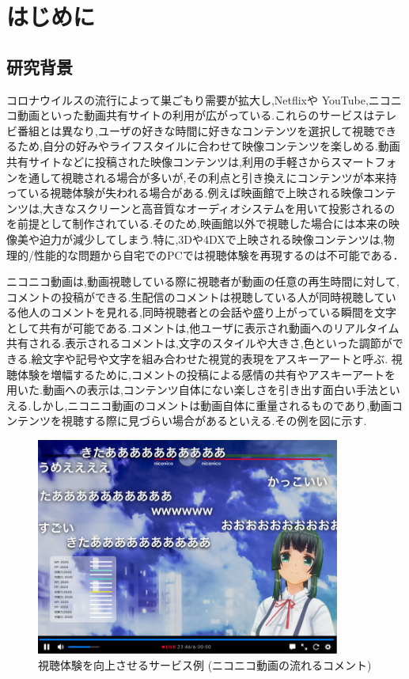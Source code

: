 \chapter{はじめに}
\thispagestyle{myheadings}

\section{研究背景}
コロナウイルスの流行によって巣ごもり需要が拡大し,Netflixや YouTube,ニコニコ動画といった動画共有サイトの利用が広がっている.これらのサービスはテレビ番組とは異なり,ユーザの好きな時間に好きなコンテンツを選択して視聴できるため,自分の好みやライフスタイルに合わせて映像コンテンツを楽しめる.動画共有サイトなどに投稿された映像コンテンツは,利用の手軽さからスマートフォンを通して視聴される場合が多いが,その利点と引き換えにコンテンツが本来持っている視聴体験が失われる場合がある.例えば映画館で上映される映像コンテンツは,大きなスクリーンと高音質なオーディオシステムを用いて投影されるのを前提として制作されている.そのため,映画館以外で視聴した場合には本来の映像美や迫力が減少してしまう.特に,3Dや4DXで上映される映像コンテンツは,物理的/性能的な問題から自宅でのPCでは視聴体験を再現するのは不可能である．

ニコニコ動画は,動画視聴している際に視聴者が動画の任意の再生時間に対して,コメントの投稿ができる.生配信のコメントは視聴している人が同時視聴している他人のコメントを見れる,同時視聴者との会話や盛り上がっている瞬間を文字として共有が可能である.コメントは,他ユーザに表示され動画へのリアルタイム共有される.表示されるコメントは,文字のスタイルや大きさ,色といった調節ができる.絵文字や記号や文字を組み合わせた視覚的表現をアスキーアートと呼ぶ.
視聴体験を増幅するために,コメントの投稿による感情の共有やアスキーアートを用いた.動画への表示は,コンテンツ自体にない楽しさを引き出す面白い手法といえる.しかし,ニコニコ動画のコメントは動画自体に重量されるものであり,動画コンテンツを視聴する際に見づらい場合があるといえる.その例を図に示す.
\begin{figure}[H]
    \centering
    \includegraphics[width=10cm]{images/chapter1/nikoniko_grafu.png}
    \caption{視聴体験を向上させるサービス例 (ニコニコ動画の流れるコメント)}
\end{figure}

